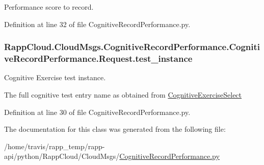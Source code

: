 Performance score to record. 



Definition at line 32 of file Cognitive\-Record\-Performance.\-py.

\hypertarget{classRappCloud_1_1CloudMsgs_1_1CognitiveRecordPerformance_1_1CognitiveRecordPerformance_1_1Request_ae0fde166148135cc8fea9aebe782c174}{
\subsubsection[{test\-\_\-instance}]{\setlength{\rightskip}{0pt plus 5cm}Rapp\-Cloud.\-Cloud\-Msgs.\-Cognitive\-Record\-Performance.\-Cognitive\-Record\-Performance.\-Request.\-test\-\_\-instance}}\label{classRappCloud_1_1CloudMsgs_1_1CognitiveRecordPerformance_1_1CognitiveRecordPerformance_1_1Request_ae0fde166148135cc8fea9aebe782c174}


Cognitive Exercise test instance. 

The full cognitive test entry name as obtained from \hyperlink{namespaceRappCloud_1_1CloudMsgs_1_1CognitiveExerciseSelect}{Cognitive\-Exercise\-Select} 

Definition at line 30 of file Cognitive\-Record\-Performance.\-py.



The documentation for this class was generated from the following file\-:\begin{DoxyCompactItemize}
\item 
/home/travis/rapp\-\_\-temp/rapp-\/api/python/\-Rapp\-Cloud/\-Cloud\-Msgs/\hyperlink{CognitiveRecordPerformance_8py}{Cognitive\-Record\-Performance.\-py}\end{DoxyCompactItemize}
